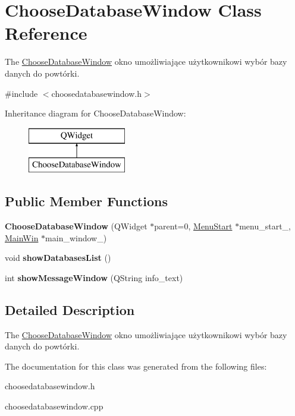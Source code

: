 \hypertarget{class_choose_database_window}{}\section{Choose\+Database\+Window Class Reference}
\label{class_choose_database_window}


The \mbox{\hyperlink{class_choose_database_window}{Choose\+Database\+Window}} okno umożliwiające użytkownikowi wybór bazy danych do powtórki.  




{\ttfamily \#include $<$choosedatabasewindow.\+h$>$}

Inheritance diagram for Choose\+Database\+Window\+:\begin{figure}[H]
\begin{center}
\leavevmode
\includegraphics[height=2.000000cm]{class_choose_database_window}
\end{center}
\end{figure}
\subsection*{Public Member Functions}
\begin{DoxyCompactItemize}
\item 
\mbox{\label{class_choose_database_window_a97a5d367fea9c9f51cf74e898626c5a8}} 
{\bfseries Choose\+Database\+Window} (Q\+Widget $\ast$parent=0, \mbox{\hyperlink{class_menu_start}{Menu\+Start}} $\ast$menu\+\_\+start\+\_, \mbox{\hyperlink{class_main_win}{Main\+Win}} $\ast$main\+\_\+window\+\_)
\item 
\mbox{\label{class_choose_database_window_a8bb827c6d1f1e60a1ea091c8ff9ef591}} 
void {\bfseries show\+Databases\+List} ()
\item 
\mbox{\label{class_choose_database_window_aa63c9e154637a45f33da4354a4761bce}} 
int {\bfseries show\+Message\+Window} (Q\+String info\+\_\+text)
\end{DoxyCompactItemize}


\subsection{Detailed Description}
The \mbox{\hyperlink{class_choose_database_window}{Choose\+Database\+Window}} okno umożliwiające użytkownikowi wybór bazy danych do powtórki. 

The documentation for this class was generated from the following files\+:\begin{DoxyCompactItemize}
\item 
choosedatabasewindow.\+h\item 
choosedatabasewindow.\+cpp\end{DoxyCompactItemize}

